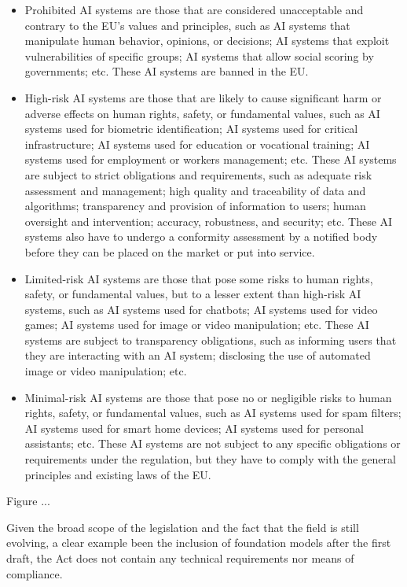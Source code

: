 \begin{itemize}	
    \item Prohibited AI systems are those that are considered unacceptable and contrary to the EU’s values and principles, such as AI systems that manipulate human behavior, opinions, or decisions; AI systems that exploit vulnerabilities of specific groups; AI systems that allow social scoring by governments; etc. These AI systems are banned in the EU.
    
    \item High-risk AI systems are those that are likely to cause significant harm or adverse effects on human rights, safety, or fundamental values, such as AI systems used for biometric identification; AI systems used for critical infrastructure; AI systems used for education or vocational training; AI systems used for employment or workers management; etc. These AI systems are subject to strict obligations and requirements, such as adequate risk assessment and management; high quality and traceability of data and algorithms; transparency and provision of information to users; human oversight and intervention; accuracy, robustness, and security; etc. These AI systems also have to undergo a conformity assessment by a notified body before they can be placed on the market or put into service.
    
    \item Limited-risk AI systems are those that pose some risks to human rights, safety, or fundamental values, but to a lesser extent than high-risk AI systems, such as AI systems used for chatbots; AI systems used for video games; AI systems used for image or video manipulation; etc. These AI systems are subject to transparency obligations, such as informing users that they are interacting with an AI system; disclosing the use of automated image or video manipulation; etc.
    
    \item Minimal-risk AI systems are those that pose no or negligible risks to human rights, safety, or fundamental values, such as AI systems used for spam filters; AI systems used for smart home devices; AI systems used for personal assistants; etc. These AI systems are not subject to any specific obligations or requirements under the regulation, but they have to comply with the general principles and existing laws of the EU.
\end{itemize}

Figure ... 

Given the broad scope of the legislation and the fact that the field is still evolving, a clear example been the inclusion of foundation models after the first draft, the Act does not contain any technical requirements nor means of compliance.

